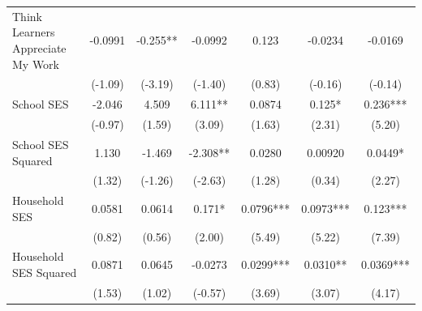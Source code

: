 \documentclass[12pt,preprint, authoryear]{article}
\numberwithin{equation}{section}
\numberwithin{figure}{section}
\numberwithin{table}{section}
\begin{document}
\begin{longtable}[htbp] {p{6cm}*{3}{c} | c c c}
Think Learners Appreciate My Work&  -0.0991          &     -0.255**      &      -0.0992       &      0.123         &      -0.0234 &   -0.0169  \\
                &    (-1.09)         &        (-3.19)            &       (-1.40)             &       (0.83)        &        (-0.16)          &    (-0.14)               \\

School SES      &   -2.046         &    4.509         &    6.111** &   0.0874         &    0.125*  &    0.236***\\
                &  (-0.97)         &   (1.59)         &   (3.09)         &   (1.63)         &   (2.31)         &   (5.20)         \\

School SES Squared&    1.130         &   -1.469         &   -2.308** &   0.0280         &  0.00920         &   0.0449*  \\
                &   (1.32)         &  (-1.26)         &  (-2.63)         &   (1.28)         &   (0.34)         &   (2.27)         \\
                
Household SES   &   0.0581         &   0.0614         &    0.171*  &   0.0796***&   0.0973***&    0.123***\\
                &   (0.82)         &   (0.56)         &   (2.00)         &   (5.49)         &   (5.22)         &   (7.39)         \\
                
Household SES Squared&   0.0871         &   0.0645         &  -0.0273         &   0.0299***&   0.0310** &   0.0369***\\
                &   (1.53)         &   (1.02)         &  (-0.57)         &   (3.69)         &   (3.07)         &   (4.17)         \\


\end{longtable}
\end{document}
